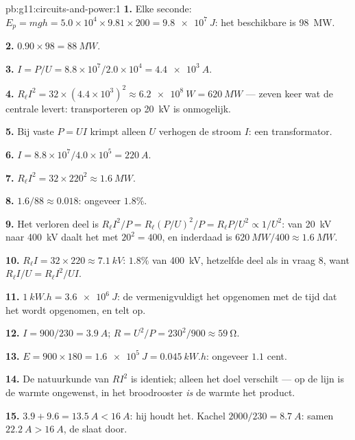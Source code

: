 \begin{solution}{pb:g11:circuits-and-power:1}
\textbf{1.} Elke seconde: $E_p = mgh = 5.0\times10^{4} \times 9.81 \times
200 = \qty{9.8e7}{J}$: het beschikbare  is \qty{98}{MW}.

\textbf{2.} $0.90 \times 98 = \qty{88}{MW}$.

\textbf{3.} $I = P/U = 8.8\times10^{7}/2.0\times10^{4} = \qty{4.4e3}{A}$.

\textbf{4.} $R_\ell I^2 = 32 \times (4.4\times10^{3})^2 \approx
\qty{6.2e8}{W} = \qty{620}{MW}$ --- zeven keer wat de centrale levert:
transporteren op \qty{20}{kV} is onmogelijk.

\textbf{5.} Bij vaste $P = UI$ krimpt alleen $U$ verhogen de stroom $I$:
een transformator.

\textbf{6.} $I = 8.8\times10^{7}/4.0\times10^{5} = \qty{220}{A}$.

\textbf{7.} $R_\ell I^2 = 32 \times 220^2 \approx \qty{1.6}{MW}$.

\textbf{8.} $1.6/88 \approx 0.018$: ongeveer $1.8\%$.

\textbf{9.} Het verloren deel is
$R_\ell I^2/P = R_\ell (P/U)^2/P = R_\ell P/U^2 \propto 1/U^2$: van
\qty{20}{kV} naar \qty{400}{kV} daalt het met $20^2 = 400$, en inderdaad
is $\qty{620}{MW}/400 \approx \qty{1.6}{MW}$.

\textbf{10.} $R_\ell I = 32 \times 220 \approx \qty{7.1}{kV}$: $1.8\%$
van \qty{400}{kV}, hetzelfde deel als in vraag 8, want
$R_\ell I/U = R_\ell I^2/UI$.

\textbf{11.} $\qty{1}{kW.h} = \qty{3.6e6}{J}$: de  vermenigvuldigt
het opgenomen  met de tijd dat het wordt opgenomen, en telt op.

\textbf{12.} $I = 900/230 = \qty{3.9}{A}$;
$R = U^2/P = 230^2/900 \approx \qty{59}{\ohm}$.

\textbf{13.} $E = 900 \times 180 = \qty{1.6e5}{J} = \qty{0.045}{kW.h}$:
ongeveer $1.1$ cent.

\textbf{14.} De natuurkunde van $RI^2$ is identiek; alleen het doel
verschilt --- op de lijn is de warmte ongewenst, in het broodrooster
\emph{is} de warmte het product.

\textbf{15.} $3.9 + 9.6 = \qty{13.5}{A} < \qty{16}{A}$: hij houdt het.
Kachel $2000/230 = \qty{8.7}{A}$: samen $\qty{22.2}{A} > \qty{16}{A}$, de
 slaat door.


\end{solution}
